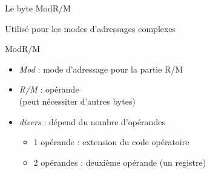 \documentclass[14pt,xcolor,table]{beamer}
\begin{document}
\begin{frame}[fragile]{Le byte ModR/M}

	Utilisé pour les modes d'adressages complexes
	
	\begin{center}
		{\small ModR/M} \\
	\end{center}
	
	\begin{itemize}
	\item \emph{Mod} : mode d'adressage pour la partie R/M
	\item \emph{R/M} : opérande \\(peut nécessiter d'autres bytes)
	\item \emph{divers} : dépend du nombre d'opérandes
		\begin{itemize}
		\item 1 opérande : extension du code opératoire
		\item 2 opérandes : deuxième opérande (un registre)
		\end{itemize}	
	\end{itemize}	

\end{frame}
\end{document}
